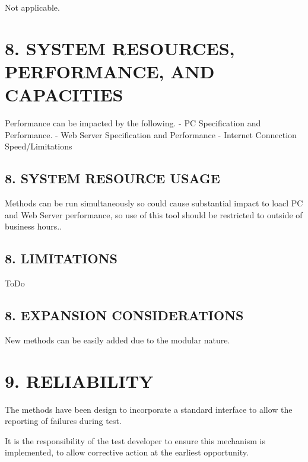 \begin{DoxyVerb}Not applicable.
\end{DoxyVerb}
\hypertarget{index_sec_8}{}\section{8.	\+S\+Y\+S\+T\+E\+M R\+E\+S\+O\+U\+R\+C\+E\+S, P\+E\+R\+F\+O\+R\+M\+A\+N\+C\+E, A\+N\+D C\+A\+P\+A\+C\+I\+T\+I\+E\+S}\label{index_sec_8}
\begin{DoxyVerb}Performance can be impacted by the following.
- PC Specification and Performance.
- Web Server Specification and Performance
- Internet Connection Speed/Limitations
\end{DoxyVerb}
\hypertarget{index_sec_8_1}{}\subsection{8.	\+S\+Y\+S\+T\+E\+M R\+E\+S\+O\+U\+R\+C\+E U\+S\+A\+G\+E}\label{index_sec_8_1}
\begin{DoxyVerb}Methods can be run simultaneously so could cause substantial impact to loacl PC and 
Web Server performance, so use of this tool should be restricted to outside of business 
hours..
\end{DoxyVerb}
\hypertarget{index_sec_8_2}{}\subsection{8.	\+L\+I\+M\+I\+T\+A\+T\+I\+O\+N\+S}\label{index_sec_8_2}
\begin{DoxyVerb}ToDo
\end{DoxyVerb}
\hypertarget{index_sec_8_3}{}\subsection{8.	\+E\+X\+P\+A\+N\+S\+I\+O\+N C\+O\+N\+S\+I\+D\+E\+R\+A\+T\+I\+O\+N\+S}\label{index_sec_8_3}
\begin{DoxyVerb}New methods can be easily added due to the modular nature.
\end{DoxyVerb}
\hypertarget{index_sec_9}{}\section{9.	\+R\+E\+L\+I\+A\+B\+I\+L\+I\+T\+Y}\label{index_sec_9}
\begin{DoxyVerb}The methods have been design to incorporate a standard interface to allow the 
reporting of failures during test.

It is the responsibility of the test developer to ensure this mechanism is implemented,
to allow corrective action at the earliest opportunity. 
\end{DoxyVerb}
